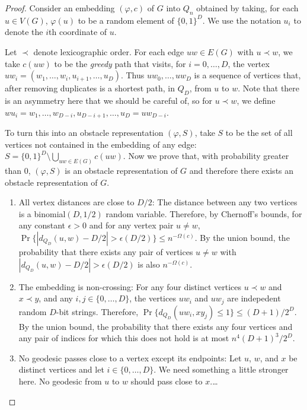 \documentclass{patmorin}
\newcommand{\eps}{\epsilon}
\begin{document}
\begin{proof}
   Consider an embedding $(\varphi,c)$ of $G$ into $Q_n$ obtained by
   taking, for each $u\in V(G)$, $\varphi(u)$ to be a random element of
   $\{0,1\}^D$.  We use the notation $u_i$ to denote the $i$th coordinate
   of $u$.

   Let $\prec$ denote lexicographic order.  For each edge
   $uw\in E(G)$ with $u\prec w$, we take $c(uw)$ to be the
   \emph{greedy} path that visits, for $i=0,\ldots,D$, the vertex
   $uw_i=(w_1,\ldots,w_i,u_{i+1},\ldots,u_D)$.  Thus $uw_0,\ldots,uw_D$
   is a sequence of vertices that, after removing duplicates is a
   shortest path, in $Q_D$, from $u$ to $w$.  Note that there is an
   asymmetry here that we should be careful of, so for $u\prec w$,
   we define $wu_i=w_1,\ldots,w_{D-i},u_{D-i+1},\ldots,u_{D}=uw_{D-i}$.

   To turn this into an obstacle representation $(\varphi, S)$, take
   $S$ to be the set of all vertices not contained in the embedding of
   any edge: $S=\{0,1\}^D\setminus\bigcup_{uw\in E(G)} c(uw)$.
   Now we prove that, with probability greater than 0, $(\varphi, S)$
   is an obstacle representation of $G$ and therefore there exists an
   obstacle representation of $G$.
  
   \begin{enumerate}
      \item All vertex distances are close to $D/2$:
       The distance between any two vertices is a
       binomial$(D,1/2)$ random variable.  Therefore, by Chernoff's
       bounds, for any constant $\eps>0$ and for any vertex pair $u\neq
       w$, $\Pr\{|d_{Q_D}(u,w)-D/2| > \eps(D/2)\} \le n^{-\Omega(c)}$.  By the
       union bound, the probability that there exists any pair of vertices
       $u\neq w$ with $|d_{Q_D}(u,w)-D/2| > \eps(D/2)$ is also $n^{-\Omega(c)}$.

      \item The embedding is non-crossing: For any four distinct vertices
      $u\prec w$ and $x\prec y$, and any $i,j\in\{0,\ldots,D\}$, the
      vertices $uw_i$ and $uw_j$ are indepedent random $D$-bit strings.
      Therefore, $\Pr\{d_{Q_D}(uw_i,xy_j)\le 1\} \le (D+1)/2^{D}$.
      By the union bound, the probability that there exists any four
      vertices and any pair of indices for which this does not hold is
      at most $n^4(D+1)^3/2^{D}$.

     \item No geodesic passes close to a vertex except its endpoints:
      Let $u$, $w$, and $x$ be distinct vertices and let
      $i\in\{0,\ldots,D\}$.  We need something a little stronger here.
      No geodesic from $u$ to $w$ should pass close to $x$.\ldots


\end{enumerate}
\end{proof}
\end{document}
